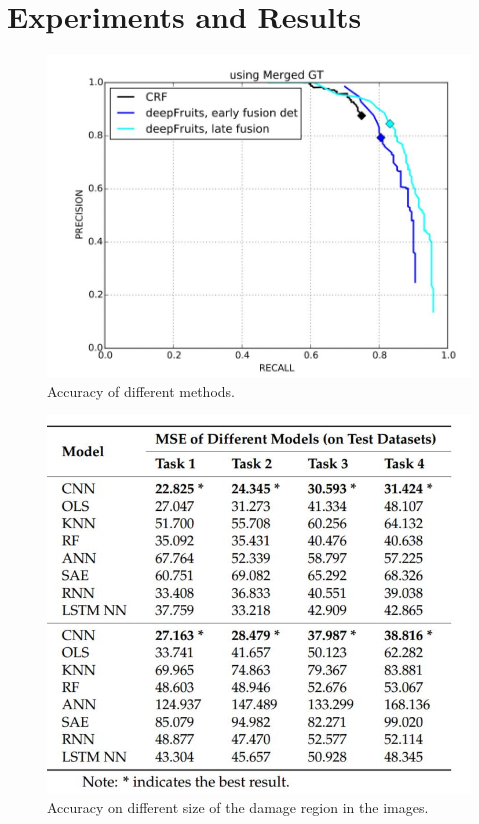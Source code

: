 \documentclass[sensors,article,submit,moreauthors,pdftex,10pt,a4paper]{mdpi}
\begin{document}
\section{Experiments and Results}

\begin{figure}[H]
	\centering
	\includegraphics[width=12 cm]{4.jpg}
	\caption{Accuracy of different methods.}
	\label{Scene-ComparedNet}
\end{figure}

\begin{figure}[H]
	\centering
	\includegraphics[width=10 cm]{5.jpg}
	\caption{Accuracy on different size of the damage region in the images.}
	\label{Scene-ComparedNet}
\end{figure}
\end{document}
